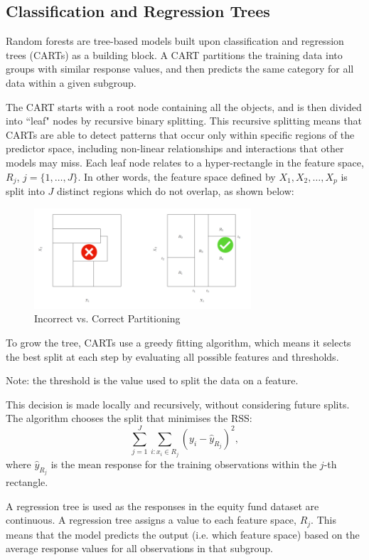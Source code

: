 \documentclass[11pt]{report} %
\begin{document}
\subsection{Classification and Regression Trees}
Random forests are tree-based models built upon classification and regression trees (CARTs) as a building block. A CART partitions the training data into groups with similar response values, and then predicts the same category for all data within a given subgroup.

The CART starts with a root node containing all the objects, and is then divided into ``leaf" nodes by recursive binary splitting.\cite{questier2005cart} 
This recursive splitting means that CARTs are able to detect patterns that occur only within specific regions of the predictor space, including non-linear relationships and interactions that other models may miss.
Each leaf node relates to a hyper-rectangle in the feature space, $R_j$, $j = \{1, \ldots, J\}$. In other words, the feature space defined by $X_1, X_2, \ldots, X_p$ is split into $J$ distinct regions which do not overlap, as shown below:
\begin{figure}[H]
    \centering
    \includegraphics[width=0.72\textwidth]{Images/partition.png}
    \caption{Incorrect vs. Correct Partitioning}
    \label{fig:partition}
\end{figure}

\noindent To grow the tree, CARTs use a greedy fitting algorithm, which means it selects the best split at each step by evaluating all possible features and thresholds. 

\noindent Note: the threshold is the value used to split the data on a feature.

\noindent This decision is made locally and recursively, without considering future splits. The algorithm chooses the split that minimises the RSS:
\[
\sum_{j=1}^J \sum_{i : x_i \in R_j} \left( y_i - \hat{y}_{R_j} \right)^2,
\]
where \( \hat{y}_{R_j} \) is the mean response for the training observations within the \( j \)-th rectangle.

A regression tree is used as the responses in the equity fund dataset are continuous. A regression tree assigns a value to each feature space, $R_j$. This means that the model predicts the output (i.e. which feature space) based on the average response values for all observations in that subgroup.
\end{document}
